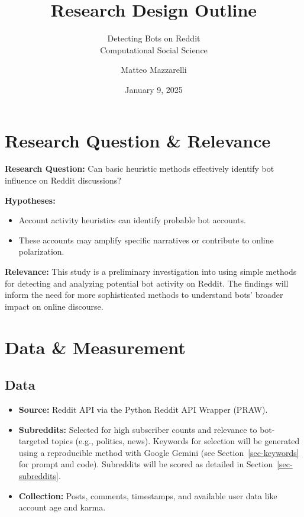 \documentclass[
  letterpaper,
  DIV=11,
  numbers=noendperiod]{scrartcl}
\title{Research Design Outline}
\subtitle{Detecting Bots on Reddit\\
Computational Social Science}
\author{Matteo Mazzarelli}
\date{January 9, 2025}
\providecommand{\tightlist}{%
  \setlength{\itemsep}{0pt}\setlength{\parskip}{0pt}}\usepackage{longtable,booktabs,array}
\begin{document}
\maketitle


\section{Research Question \&
Relevance}\label{research-question-relevance}

\textbf{Research Question:} Can basic heuristic methods effectively
identify bot influence on Reddit discussions?

\textbf{Hypotheses:}

\begin{itemize}
\tightlist
\item
  Account activity heuristics can identify probable bot accounts.
\item
  These accounts may amplify specific narratives or contribute to online
  polarization.
\end{itemize}

\textbf{Relevance:} This study is a preliminary investigation into using
simple methods for detecting and analyzing potential bot activity on
Reddit. The findings will inform the need for more sophisticated methods
to understand bots' broader impact on online discourse.

\section{Data \& Measurement}\label{sec-data}

\subsection{Data}\label{data}

\begin{itemize}
\tightlist
\item
  \textbf{Source:} Reddit API via the Python Reddit API Wrapper (PRAW).
\item
  \textbf{Subreddits:} Selected for high subscriber counts and relevance
  to bot-targeted topics (e.g., politics, news). Keywords for selection
  will be generated using a reproducible method with Google Gemini (see
  Section~\ref{sec-keywords} for prompt and code). Subreddits will be
  scored as detailed in Section~\ref{sec-subreddits}.
\item
  \textbf{Collection:} Posts, comments, timestamps, and available user
  data like account age and karma.
\end{itemize}
\end{document}
